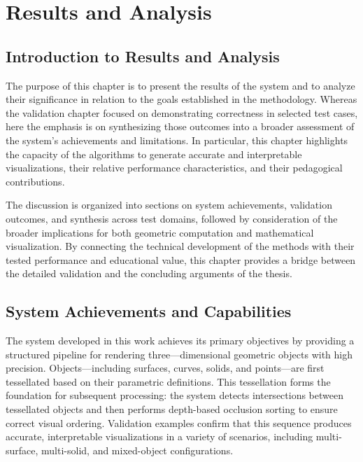 \chapter{Results and Analysis}

\section{Introduction to Results and Analysis}

The purpose of this chapter is to present the results of the system and 
to analyze their significance in relation to the goals established in the 
methodology. Whereas the validation chapter focused on demonstrating 
correctness in selected test cases, here the emphasis is on synthesizing 
those outcomes into a broader assessment of the system's achievements 
and limitations. In particular, this chapter highlights the capacity of 
the algorithms to generate accurate and interpretable visualizations, 
their relative performance characteristics, and their pedagogical 
contributions. 

The discussion is organized into sections on system achievements, 
validation outcomes, and synthesis across test domains, followed by 
consideration of the broader implications for both geometric computation 
and mathematical visualization. By connecting the technical development 
of the methods with their tested performance and educational value, this 
chapter provides a bridge between the detailed validation and the 
concluding arguments of the thesis. 

\section{System Achievements and Capabilities}

The system developed in this work achieves its primary objectives by 
providing a structured pipeline for rendering three---dimensional geometric 
objects with high precision. Objects—including surfaces, curves, solids, 
and points---are first tessellated based on their parametric definitions. 
This tessellation forms the foundation for subsequent processing: the 
system detects intersections between tessellated objects and then performs 
depth-based occlusion sorting to ensure correct visual ordering. Validation 
examples confirm that this sequence produces accurate, interpretable 
visualizations in a variety of scenarios, including multi-surface, 
multi-solid, and mixed-object configurations.

